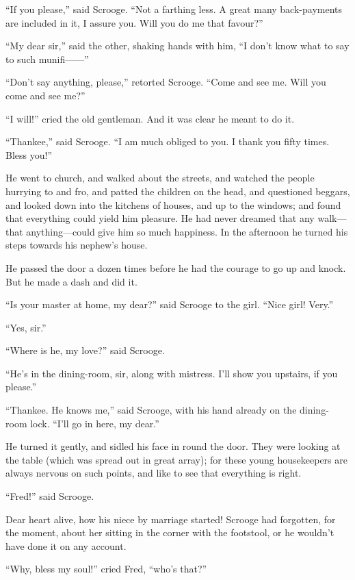 \documentclass[paper=a5,BCOR=15mm,twoside,DIV=15,headinclude=off,12pt,chapterprefix=off,openany,headings=huge]{scrbook} %
\begin{document}
\enquote{If you please,} said Scrooge. \enquote{Not a farthing less. A great many back-payments are included in it, I assure you. Will you do me that favour?}

\enquote{My dear sir,} said the other, shaking hands with him, \enquote{I don't know what to say to such munifi——}

\enquote{Don't say anything, please,} retorted Scrooge. \enquote{Come and see me. Will you come and see me?}

\enquote{I will!} cried the old gentleman. And it was clear he meant to do it.

\enquote{Thankee,} said Scrooge. \enquote{I am much obliged to you. I thank you fifty times. Bless you!}

He went to church, and walked about the streets, and watched the people hurrying to and fro, and patted the children on the head, and questioned beggars, and looked down into the kitchens of houses, and up to the windows; and found that everything could yield him pleasure. He had never dreamed that any walk—that anything—could give him so much happiness. In the afternoon he turned his steps towards his nephew's house.

He passed the door a dozen times before he had the courage to go up and knock. But he made a dash and did it.

\enquote{Is your master at home, my dear?} said Scrooge to the girl. \enquote{Nice girl! Very.}

\enquote{Yes, sir.}

\enquote{Where is he, my love?} said Scrooge.

\enquote{He's in the dining-room, sir, along with mistress. I'll show you upstairs, if you please.}

\enquote{Thankee. He knows me,} said Scrooge, with his hand already on the dining-room lock. \enquote{I'll go in here, my dear.}

He turned it gently, and sidled his face in round the door. They were looking at the table (which was spread out in great array); for these young housekeepers are always nervous on such points, and like to see that everything is right.

\enquote{Fred!} said Scrooge.

Dear heart alive, how his niece by marriage started! Scrooge had forgotten, for the moment, about her sitting in the corner with the footstool, or he wouldn't have done it on any account.

\enquote{Why, bless my soul!} cried Fred, \enquote{who's that?}
\end{document}
